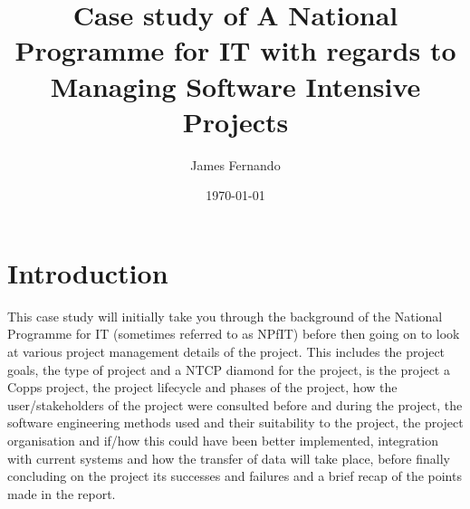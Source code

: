 \documentclass[a4paper,12pt]{scrartcl}
\title{Case study of A National Programme for IT with regards to Managing Software Intensive Projects}
\author{James Fernando}
\date{\today}
\begin{document}
	
	\begin{titlepage}
		\maketitle
	\end{titlepage}
	
	\tableofcontents
	\newpage
	\section{Introduction}
	{
		This case study will initially take you through the background of the National Programme for IT (sometimes referred to as NPfIT) before then going on to look at various project management details of the project. This includes the project goals, the type of project and a NTCP diamond for the project, is the project a Copps project, the project lifecycle and phases of the project, how the user/stakeholders of the project were consulted before and during the project, the software engineering methods used and their suitability to the project, the project organisation and if/how this could have been better implemented, integration with current systems and how the transfer of data will take place, before finally concluding on the project its successes and failures and a brief recap of the points made in the report.
	}
\end{document}
